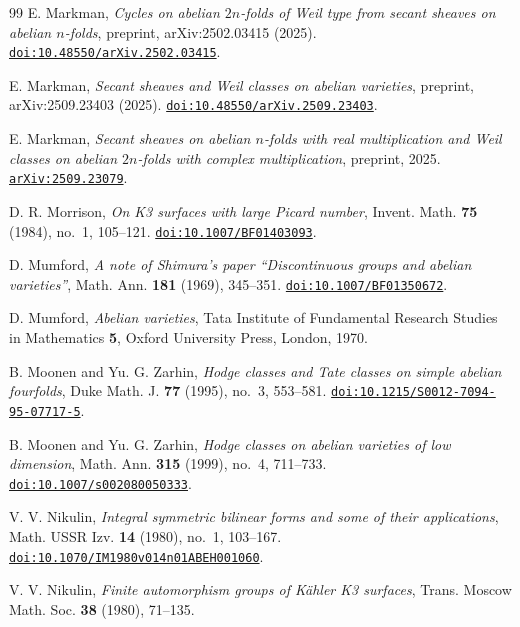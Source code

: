 \documentclass[11pt,reqno]{amsart}
\numberwithin{equation}{section}
\theoremstyle{plain}
\theoremstyle{definition}
\begin{document}
\begin{thebibliography}{99}
E. Markman,
\emph{Cycles on abelian $2n$-folds of Weil type from secant sheaves on abelian
$n$-folds}, preprint, arXiv:2502.03415 (2025).
\href{https://doi.org/10.48550/arXiv.2502.03415}{\nolinkurl{doi:10.48550/arXiv.2502.03415}}.

E. Markman,
\emph{Secant sheaves and Weil classes on abelian varieties},
preprint, arXiv:2509.23403 (2025).
\href{https://doi.org/10.48550/arXiv.2509.23403}{\nolinkurl{doi:10.48550/arXiv.2509.23403}}.

E. Markman,
\emph{Secant sheaves on abelian $n$-folds with real multiplication and Weil
classes on abelian $2n$-folds with complex multiplication},
preprint, 2025.
\href{https://arxiv.org/abs/2509.23079}{\nolinkurl{arXiv:2509.23079}}.

D. R. Morrison,
\emph{On K3 surfaces with large Picard number},
Invent. Math. \textbf{75} (1984), no.~1, 105--121.
\href{https://doi.org/10.1007/BF01403093}{\nolinkurl{doi:10.1007/BF01403093}}.

D. Mumford,
\emph{A note of Shimura's paper ``Discontinuous groups and abelian
varieties''},
Math. Ann. \textbf{181} (1969), 345--351.
\href{https://doi.org/10.1007/BF01350672}{\nolinkurl{doi:10.1007/BF01350672}}.

D. Mumford,
\emph{Abelian varieties},
Tata Institute of Fundamental Research Studies in Mathematics \textbf{5}, Oxford University Press, London, 1970.

B. Moonen and Yu. G. Zarhin,
\emph{Hodge classes and Tate classes on simple abelian fourfolds},
Duke Math. J. \textbf{77} (1995), no.~3, 553--581.
\href{https://doi.org/10.1215/S0012-7094-95-07717-5}{\nolinkurl{doi:10.1215/S0012-7094-95-07717-5}}.

B. Moonen and Yu. G. Zarhin,
\emph{Hodge classes on abelian varieties of low dimension},
Math. Ann. \textbf{315} (1999), no.~4, 711--733.
\href{https://doi.org/10.1007/s002080050333}{\nolinkurl{doi:10.1007/s002080050333}}.

V. V. Nikulin,
\emph{Integral symmetric bilinear forms and some of their applications},
Math. USSR Izv. \textbf{14} (1980), no.~1, 103--167.
\href{https://doi.org/10.1070/IM1980v014n01ABEH001060}{\nolinkurl{doi:10.1070/IM1980v014n01ABEH001060}}.

V. V. Nikulin,
\emph{Finite automorphism groups of K\"ahler K3 surfaces},
Trans. Moscow Math. Soc. \textbf{38} (1980), 71--135.


\end{thebibliography}
\end{document}

